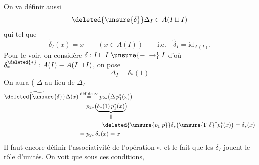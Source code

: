 On va définir aussi
\[
 \deleted{\unsure{\delta}}\Delta_I\in A(I\sqcup I)
\]
qui  tel que
\[
 \widetilde{\delta}_I(x)=x\qquad (x\in A(I))\qquad \text{i.e.}\quad \widetilde{\delta}_I=\mathrm{id}_{A(I)}.
\]
Pour \deleted{\unsure{$\delta$}} le voir, on  considère $\delta:I\sqcup I\mathrel{\unsure{-|\to}}I$
d'où $\delta^{\deleted{*}}_*:A(I)\mathrel{-}A(I\sqcup I)$, on pose
\[
 \Delta_I=\delta_*(1)
\]
On aura ( $\Delta$ au lieu de $\Delta_I$
\[
\begin{aligned}
 \widetilde{\deleted{\unsure{\delta}}\Delta}(x)&\overset{\text{déf de }\sim}{=}p_{2*}\bigl(\Delta\,p_1^*(x)\bigr)\\
 &=p_{2*}\bigl(\underbrace{\delta_*(1)\,p_1^*(x)}_{\parallel}\bigr)\\
 &\hspace{4em}\deleted{\unsure{p_1|p}}\delta_*\bigl(\unsure{\Gamma|\delta}^*p_1^*(x)\bigr)=\delta_*(x)\\
 &=p_{2*}\,\delta_*(x)=x
\end{aligned}
\]
Il faut encore définir l'associativité de
l'opération $\circ$, et le fait que les $\delta_I$ jouent le
rôle d'unités. On voit que sous ces conditions,

